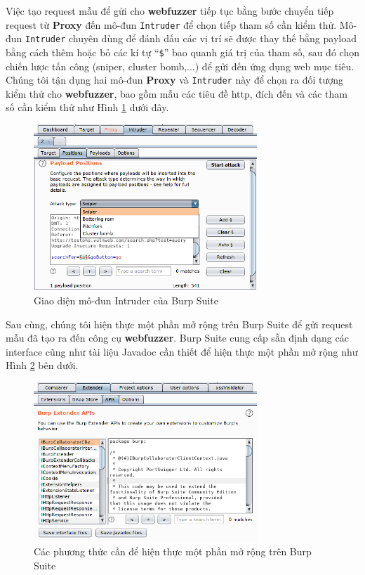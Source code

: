 Việc tạo request mẫu để gửi cho \textbf{webfuzzer} tiếp tục bằng bước chuyển tiếp request từ \textbf{Proxy} đến mô-đun \texttt{Intruder} để chọn tiếp tham số cần kiểm thử. Mô-đun \texttt{Intruder} chuyên dùng để đánh dấu các vị trí sẽ được thay thế bằng payload bằng cách thêm hoặc bỏ các kí tự ``\texttt{\$}'' bao quanh giá trị của tham số, sau đó chọn chiến lược tấn công (sniper, cluster bomb,...) để gửi đến ứng dụng web mục tiêu. Chúng tôi tận dụng hai mô-đun \textbf{Proxy} và \texttt{Intruder} này để chọn ra đối tượng kiểm thử cho \textbf{webfuzzer}, bao gồm mẫu các tiêu đề \acrshort{http}, đích đến và các tham số cần kiểm thử như Hình \ref{fig:burp-intruder} dưới đây.
\begin{figure}[H]
  \centering
    \includegraphics[width=0.75\textwidth,keepaspectratio=true]{images/burp-intruder.png}
  \caption{Giao diện mô-đun Intruder của Burp Suite}
  \label{fig:burp-intruder}
\end{figure}
Sau cùng, chúng tôi hiện thực một phần mở rộng trên Burp Suite để gửi request mẫu đã tạo ra đến công cụ \textbf{webfuzzer}. Burp Suite cung cấp sẵn định dạng các interface cũng như tài liệu Javadoc cần thiết để hiện thực một phần mở rộng như Hình \ref{fig:burp-extender} bên dưới.
\begin{figure}[H]
  \centering
    \includegraphics[width=0.75\textwidth,keepaspectratio=true]{images/burp-extender.png}
  \caption{Các phương thức cần để hiện thực một phần mở rộng trên Burp Suite}
  \label{fig:burp-extender}
\end{figure}

